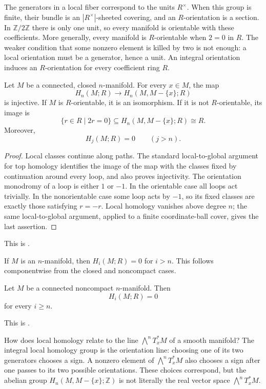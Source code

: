 \noindent
The generators in a local fiber correspond
to the units $R^\times$.  When this group is
finite, their bundle is an
$|R^\times|$-sheeted covering, and an
$R$-orientation is a section.  In
$\mathbb{Z}/2\mathbb{Z}$ there is only one
unit, so every manifold is orientable with
these coefficients.  More generally, every
manifold is $R$-orientable when $2=0$ in
$R$.  The weaker condition that some
nonzero element is killed by two is not
enough: a local orientation must be a
generator, hence a unit.  An integral
orientation induces an $R$-orientation for
every coefficient ring $R$.

\begin{theorem}
\label{at-theorem-top-manifold-homology}
Let $M$ be a connected, closed
$n$-manifold.  For every $x\in M$, the map
$$
H_n(M;R)\longrightarrow
H_n(M,M-\{x\};R)
$$
is injective.  If $M$ is $R$-orientable,
it is an isomorphism.  If it is not
$R$-orientable, its image is
$$
\{r\in R\mid 2r=0\}
\subseteq H_n(M,M-\{x\};R)
\cong R.
$$
Moreover,
$$
H_j(M;R)=0
\qquad (j>n).
$$
\end{theorem}

\begin{proof}
Local classes continue along paths.  The
standard local-to-global argument for top
homology identifies the image of the map
with the classes fixed by continuation
around every loop, and also proves
injectivity.  The orientation monodromy of
a loop is either $1$ or $-1$.  In the
orientable case all loops act trivially.  In
the nonorientable case some loop acts by
$-1$, so its fixed classes are exactly
those satisfying $r=-r$.  Local homology
vanishes above degree $n$; the same
local-to-global argument, applied to a
finite coordinate-ball cover, gives the
last assertion.
\end{proof}

This is \cite[Theorem 3.26]{hat}.

\begin{lemma}
If $M$ is an $n$-manifold, then
$H_i(M;R)=0$ for $i>n$. This follows
componentwise from the closed and noncompact
cases.
\end{lemma}

\begin{proposition}
Let $M$ be a connected noncompact
$n$-manifold. Then
$$
H_i(M;R)=0
$$
for every $i\geq n$.
\end{proposition}

This is \cite[Proposition 3.29]{hat}.

\begin{remark}[Question]
\label{at-remark-local-determinant}
How does local homology relate to the line
$\bigwedge^n T_x^*M$ of a smooth manifold?
The integral local homology group is the
orientation line: choosing one of its two
generators chooses a sign.  A nonzero
element of $\bigwedge^n T_x^*M$ also
chooses a sign after one passes to its two
possible orientations.  These choices
correspond, but the abelian group
$H_n(M,M-\{x\};\mathbb{Z})$ is not
literally the real vector space
$\bigwedge^n T_x^*M$.
\end{remark}

